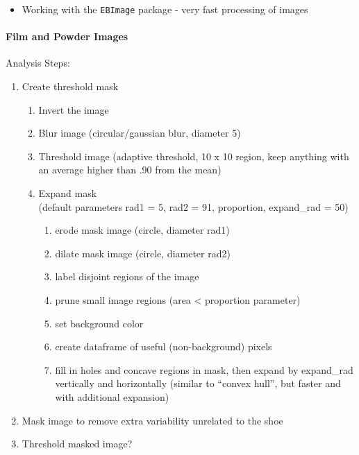 \documentclass[]{book}
\providecommand{\tightlist}{%
  \setlength{\itemsep}{0pt}\setlength{\parskip}{0pt}}
\let\oldparagraph\paragraph
\renewcommand{\paragraph}[1]{\oldparagraph{#1}\mbox{}}
\begin{document}
\begin{itemize}
\tightlist
\item
  Working with the \texttt{EBImage} package - very fast processing of images
\end{itemize}

\hypertarget{film-and-powder-images}{%
\paragraph{Film and Powder Images}\label{film-and-powder-images}}

Analysis Steps:

\begin{enumerate}
\def\labelenumi{\arabic{enumi}.}
\item
  Create threshold mask

  \begin{enumerate}
  \def\labelenumii{\alph{enumii}.}
  \item
    Invert the image\\
  \item
    Blur image (circular/gaussian blur, diameter 5)\\
  \item
    Threshold image (adaptive threshold, 10 x 10 region, keep anything with an average higher than .90 from the mean)\\
  \item
    Expand mask\\
    (default parameters rad1 = 5, rad2 = 91, proportion, expand\_rad = 50)\\

    \begin{enumerate}
    \def\labelenumiii{\arabic{enumiii}.}
    \tightlist
    \item
      erode mask image (circle, diameter rad1)
    \item
      dilate mask image (circle, diameter rad2)
    \item
      label disjoint regions of the image
    \item
      prune small image regions (area \textless{} proportion parameter)
    \item
      set background color
    \item
      create dataframe of useful (non-background) pixels
    \item
      fill in holes and concave regions in mask, then expand by expand\_rad vertically and horizontally (similar to ``convex hull'', but faster and with additional expansion)
    \end{enumerate}
  \end{enumerate}
\item
  Mask image to remove extra variability unrelated to the shoe\\
\item
  Threshold masked image?\\
\end{enumerate}
\end{document}
